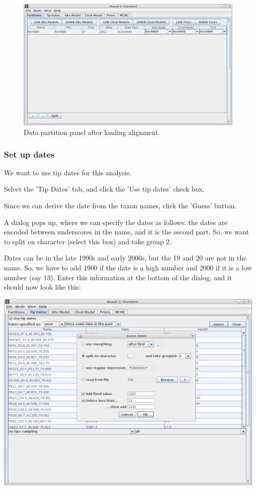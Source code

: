 \documentclass{article}
\begin{document}
\begin{figure}
\begin{center}

\includegraphics[scale=0.4]{figures/BEAUti_DataPartitions}

\end{center}
\caption{\label{fig.datapartition} Data partition panel after loading alignment.}
\end{figure}

\subsubsection*{Set up dates}

We want to use tip dates for this analysis.

Select the 'Tip Dates' tab, and click the 'Use tip dates' check box.

Since we can derive the date from the taxon names, click the 'Guess' button.

A dialog pops up, where we can specify the dates as follows: the dates are encoded between underscores in the name, and it is the second part. So, we want to split on character (select this box) and take group 2.

Dates can be in the late 1990s and early 2000s, but the 19 and 20 are not in the name. So, we have to add 1900 if the date is a high number and 2000 if it is a low number (say 13). Enter this information at the bottom of the dialog, and it should now look like this:

\includegraphics[scale=0.4]{figures/BEAUti_dates.png}
\end{document}
